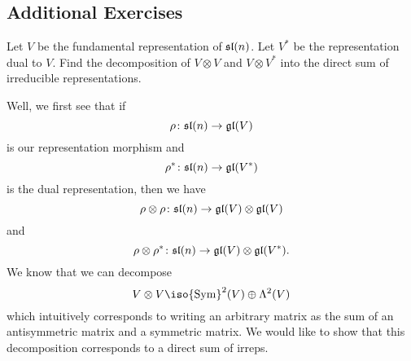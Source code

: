 \subsection{Additional Exercises}
\begin{exercise}
Let $V$ be the fundamental representation of $\frak{sl}(n)$. Let
$V^{*}$ be the representation dual to $V$. Find  the
decomposition of $V\otimes V$ and $V\otimes V^{*}$ into the
direct sum of irreducible representations.
\end{exercise}

\answer Well, we first see that if
\begin{equation}
\rho\colon\frak{sl}(n)\to \frak{gl}(V)
\end{equation}
is our representation morphism and
\begin{equation}
\rho^{*}\colon\frak{sl}(n)\to \frak{gl}(V^{*})
\end{equation}
is the dual representation, then we have
\begin{equation}
\rho\otimes\rho\colon\frak{sl}(n)\to \frak{gl}(V)\otimes \frak{gl}(V)
\end{equation}
and
\begin{equation}
\rho\otimes\rho^{*}\colon\frak{sl}(n)\to \frak{gl}(V)\otimes \frak{gl}(V^{*}).
\end{equation}
We know that we can decompose
\begin{equation}\label{eq:decomposition}
V\otimes V\iso {\rm Sym}^{2}(V)\oplus\Lambda^{2}(V)
\end{equation}
which intuitively corresponds to writing an arbitrary matrix as
the sum of an antisymmetric matrix and a symmetric matrix. We
would like to show that this decomposition corresponds to a
direct sum of irreps.

